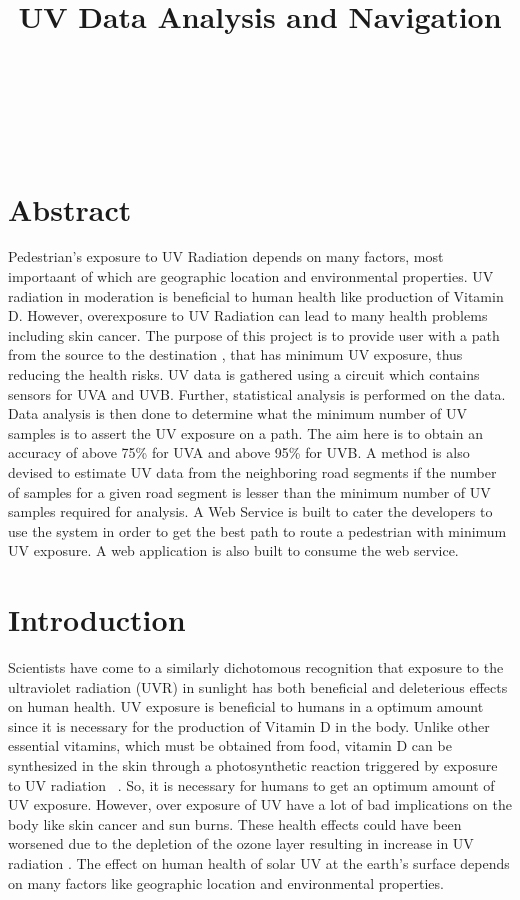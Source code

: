 \documentclass[10pt]{sigplan-proc-varsize}
\author{
%
\alignauthor{Aditya Modi, Jerrid Matthews, Mario Gerla } \\
        \affaddr{Department of Computer Science}\\
        \affaddr{University of California, Los Angeles}\\
        \affaddr{Los Angeles. CA 90024}\\
       \email{\{adityam, matth122, gerla\}@cs.ucla.edu}
}
\title{\textbf{ UV Data Analysis and Navigation}}
\begin{document}
\maketitle

\section{Abstract} Pedestrian’s exposure to UV Radiation depends on many factors, most importaant of which are geographic location and environmental properties. UV radiation in moderation is beneficial to human health like production of Vitamin D. However, overexposure to UV Radiation can lead to many health problems including skin cancer. The purpose of this project is to provide user with a path from the source to the destination , that has minimum UV exposure, thus reducing the health risks. UV data is gathered using a circuit which contains sensors for UVA and UVB. Further, statistical analysis is performed on the data. Data analysis is then done to determine what the minimum number of UV samples is to assert the UV exposure on a path. The aim here is to obtain an accuracy of above 75\% for UVA and above 95\% for UVB. A method is also devised to estimate UV data from the neighboring road segments if the number of samples for a given road segment is lesser than the minimum number of UV samples required for analysis. A Web Service is built to cater the developers to use the system in order to get the best path to route a pedestrian with minimum UV exposure. A web application is also built to consume the web service.\\


\section{Introduction}
Scientists have come to a similarly dichotomous recognition that exposure to the ultraviolet radiation (UVR) in sunlight has both beneficial and deleterious effects on human health. UV exposure is beneficial to humans in a optimum amount since it is necessary for the production of Vitamin D in the body. Unlike other essential vitamins, which must be obtained from food, vitamin D can be synthesized in the skin through a photosynthetic reaction triggered by exposure to UV radiation ~\cite{dep1}. So, it is necessary for humans to get an optimum amount of UV exposure. However, over exposure of UV have a lot of bad implications on the body like skin cancer and sun burns. These health effects could have been worsened due to the depletion of the ozone layer resulting in increase in UV radiation \cite{dep2}. The effect on human health of solar UV at the earth’s surface depends on many factors like geographic location and environmental properties.  
\end{document}
